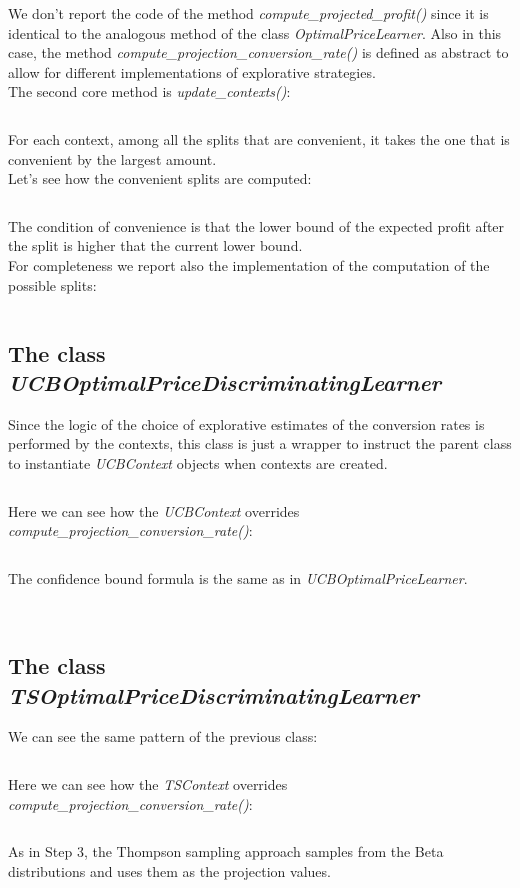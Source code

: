 \documentclass[11pt]{article} %
\begin{document}
\inputminted{python}{code/step4_context_next_arm.py}
We don't report the code of the method \textit{compute\_projected\_profit()} since it is identical to the analogous method of the class \textit{OptimalPriceLearner}. Also in this case, the method \textit{compute\_projection\_conversion\_rate()} is defined as abstract to allow for different implementations of explorative strategies.\\

The second core method is \textit{update\_contexts()}:
\inputminted{python}{code/step4_update_contexts.py}
For each context, among all the splits that are convenient, it takes the one that is convenient by the largest amount.\\

Let's see how the convenient splits are computed:

\inputminted{python}{code/step4_convenient_split.py}

The condition of convenience is that the lower bound of the expected profit after the split is higher that the current lower bound.\\

For completeness we report also the implementation of the computation of the possible splits:
\inputminted{python}{code/step4_possible_split.py}
\begin{samepage}
\subsection{The class \textit{UCBOptimalPriceDiscriminatingLearner}}
Since the logic of the choice of explorative estimates of the conversion rates is performed by the contexts, this class is just a wrapper to instruct the parent class to instantiate \textit{UCBContext} objects when contexts are created.

\inputminted{python}{code/step4_ucb_disc.py}
Here we can see how the \textit{UCBContext} overrides  \textit{compute\_projection\_conversion\_rate()}:
\inputminted{python}{code/step4_ucbcontext_projection.py}
The confidence bound formula is the same as in \textit{UCBOptimalPriceLearner}.
\end{samepage}
\\

\begin{samepage}
\subsection{The class \textit{TSOptimalPriceDiscriminatingLearner}}
We can see the same pattern of the previous class:
\inputminted{python}{code/step4_ts_disc.py}

Here we can see how the \textit{TSContext} overrides  \textit{compute\_projection\_conversion\_rate()}:
\inputminted{python}{code/step4_tscontext_projection.py}
As in Step 3, the Thompson sampling approach samples from the Beta distributions and uses them as the projection values.
\end{samepage}
\\
\end{document}
